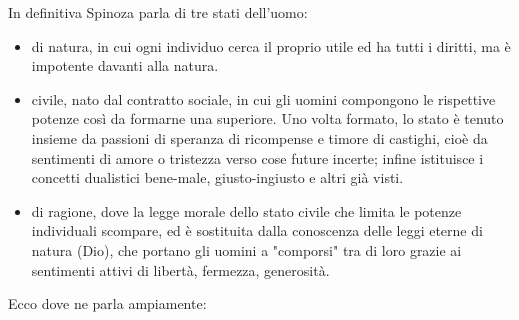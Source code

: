 In definitiva Spinoza parla di tre stati dell'uomo:
\begin{itemize}
	\item di natura, in cui ogni individuo cerca il proprio utile ed ha tutti i diritti, ma è impotente davanti alla natura.
	\item civile, nato dal contratto sociale, in cui gli uomini compongono le rispettive potenze così da formarne una superiore. Uno volta formato, lo stato è tenuto insieme da passioni di speranza di ricompense e timore di castighi, cioè da sentimenti di amore o tristezza verso cose future incerte; infine istituisce i concetti dualistici bene-male, giusto-ingiusto e altri già visti.
	\item di ragione, dove la legge morale dello stato civile che limita le potenze individuali scompare, ed è sostituita dalla conoscenza delle leggi eterne di natura (Dio), che portano gli uomini a "comporsi" tra di loro grazie ai sentimenti attivi di libertà, fermezza, generosità.
\end{itemize}

Ecco dove ne parla ampiamente:

